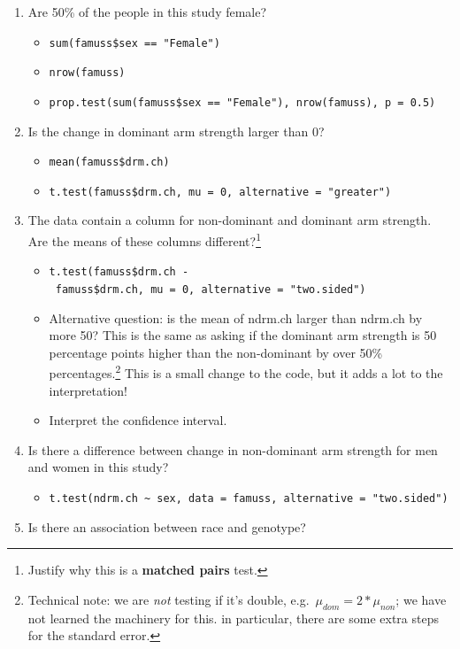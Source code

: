 \documentclass[
  letterpaper,
  DIV=11,
  numbers=noendperiod,
  oneside]{scrreprt}
\providecommand{\tightlist}{%
  \setlength{\itemsep}{0pt}\setlength{\parskip}{0pt}}\usepackage{longtable,booktabs,array}
\begin{document}
\begin{enumerate}
\def\labelenumi{\arabic{enumi}.}
\tightlist
\item
  Are 50\% of the people in this study female?

  \begin{itemize}
  \tightlist
  \item
    \texttt{sum(famuss\$sex\ ==\ "Female")}
  \item
    \texttt{nrow(famuss)}
  \item
    \texttt{prop.test(sum(famuss\$sex\ ==\ "Female"),\ nrow(famuss),\ p\ =\ 0.5)}
  \end{itemize}
\item
  Is the change in dominant arm strength larger than 0?

  \begin{itemize}
  \tightlist
  \item
    \texttt{mean(famuss\$drm.ch)}
  \item
    \texttt{t.test(famuss\$drm.ch,\ mu\ =\ 0,\ alternative\ =\ "greater")}
  \end{itemize}
\item
  The data contain a column for non-dominant and dominant arm strength.
  Are the means of these columns different?\footnote{Justify why this is
    a \textbf{matched pairs} test.}

  \begin{itemize}
  \tightlist
  \item
    \texttt{t.test(famuss\$drm.ch\ -\ famuss\$drm.ch,\ mu\ =\ 0,\ alternative\ =\ "two.sided")}
  \item
    Alternative question: is the mean of ndrm.ch larger than ndrm.ch by
    more 50? This is the same as asking if the dominant arm strength is
    50 percentage points higher than the non-dominant by over 50\%
    percentages.\footnote{Technical note: we are \emph{not} testing if
      it's double, e.g.~\(\mu_{dom} = 2*\mu_{non}\); we have not learned
      the machinery for this. in particular, there are some extra steps
      for the standard error.} This is a small change to the code, but
    it adds a lot to the interpretation!
  \item
    Interpret the confidence interval.
  \end{itemize}
\item
  Is there a difference between change in non-dominant arm strength for
  men and women in this study?

  \begin{itemize}
  \tightlist
  \item
    \texttt{t.test(ndrm.ch\ \textasciitilde{}\ sex,\ data\ =\ famuss,\ alternative\ =\ "two.sided")}
  \end{itemize}
\item
  Is there an association between race and genotype?


\end{enumerate}
\end{document}

